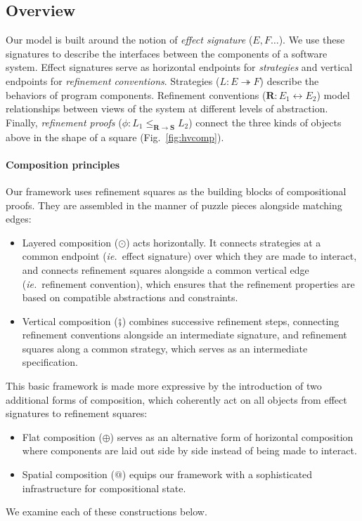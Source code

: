 \documentclass[acmsmall,screen,review,anonymous,nonacm]{acmart}
\begin{document}
\subsection{Overview} %


Our model is built around the notion of \emph{effect signature} ($E, F\ldots$).
We use these signatures to describe the
interfaces between the components of a software system.
Effect signatures serve
as horizontal endpoints for \emph{strategies}
and vertical endpoints for \emph{refinement conventions}.
Strategies
($L : E \twoheadrightarrow F$)
describe the behaviors of program components.
Refinement conventions
($\mathbf{R} : E_1 \leftrightarrow E_2$)
model relationships between
views of the system at different levels of abstraction.
Finally,
\emph{refinement proofs}
($\phi : L_1 \le_{\mathbf{R} \rightarrow \mathbf{S}} L_2$)
connect the three kinds of objects above
in the shape of a square (Fig.~\ref{fig:hvcomp}).


\paragraph{Composition principles} %

Our framework uses
refinement squares as the building blocks of compositional proofs.
They are assembled in the manner of puzzle pieces
alongside matching edges:
\begin{itemize}
\item Layered composition ($\odot$) acts horizontally.
  It connects strategies at a common endpoint (\emph{ie.}~effect signature)
  over which they are made to interact,
  and connects refinement squares alongside a common
  vertical edge (\emph{ie.}~refinement convention),
  which ensures that the refinement properties
  are based on compatible abstractions and constraints.
\item Vertical composition ($\fatsemi$)
  combines successive refinement steps,
  connecting refinement conventions alongside an intermediate signature,
  and refinement squares along a common strategy,
  which serves as an intermediate specification.
\end{itemize}
This basic framework is made more expressive
by the introduction of two additional forms of composition,
which coherently act on all objects from effect signatures to refinement squares:
\begin{itemize}
\item Flat composition ($\oplus$)
  serves as an alternative form of horizontal composition
  where components are laid out side by side
  instead of being made to interact.
\item Spatial composition ($\mathbin@$)
  equips our framework with a sophisticated infrastructure
  for compositional state.
\end{itemize}
We examine each of these constructions below.
\end{document}
